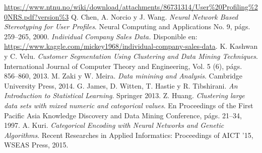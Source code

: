 \documentclass[letterpaper,11pt]{article}
\begin{document}
\begin{multicols}{2}
\begin{thebibliography}{10}
{        \url{https://www.ntnu.no/wiki/download/attachments/86731314/User%20Profiling%20NRS.pdf?version%3}
     Q. Chen, A. Norcio y J. Wang. {\em Neural Network Based Stereotyping for User Profiles}. Neural
        Computing and Applications No. 9, págs. 259--265,  2000.
     {\em Individual Company Sales Data.} Disponible en:
        \url{https://www.kaggle.com/mickey1968/individual-company-sales-data}. 
     K. Kashwan y C. Velu. {\em Customer Segmentation Using Clustering and Data Mining Techniques}. International Journal of Computer Theory 
        and Engineering, Vol. 5 (6), págs. 856--860, 2013. 
     M. Zaki y W. Meira. {\em Data minining and Analysis}. Cambridge University Press, 2014. 
     G. James, D. Witten, T. Hastie y R. Tibshirani. {\em An Introduction to Statistical Learning}.
        Springer 2013.
     Z.  Huang. {\em Clustering large data sets with mixed numeric and categorical values}. En Proceedings of the First Pacific Asia 
        Knowledge Discovery and Data Mining Conference, págs. 21--34, 1997.
     A. Kuri. {\em Categorical Encoding with Neural Networks and Genetic Algorithms}. Recent Researches in
        Applied Informatics: Proceedings of AICT '15, WSEAS Press, 2015.
    }
\end{thebibliography}
    \end{multicols}
\end{document}
